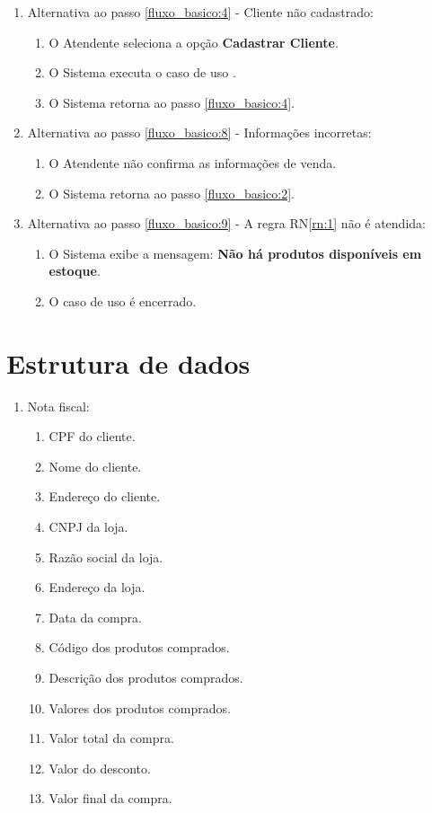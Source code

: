\begin{enumerate}
	\item Alternativa ao passo \ref{fluxo_basico:4} - Cliente não cadastrado:
	\begin{enumerate}
		\item O Atendente seleciona a opção \textbf{Cadastrar Cliente}.
		\item O Sistema executa o caso de uso .
		\item O Sistema retorna ao passo \ref{fluxo_basico:4}.
	\end{enumerate}
	\item Alternativa ao passo \ref{fluxo_basico:8} - Informações incorretas:
	\begin{enumerate}
		\item O Atendente não confirma as informações de venda.
		\item O Sistema retorna ao passo \ref{fluxo_basico:2}.
	\end{enumerate}
	\item Alternativa ao passo \ref{fluxo_basico:9} - A regra RN\ref{rn:1} não é atendida:
	\begin{enumerate}
		\item O Sistema exibe a mensagem: \textbf{Não há produtos disponíveis em estoque}.
		\item O caso de uso é encerrado.
	\end{enumerate}
\end{enumerate}

\section{Estrutura de dados}

\begin{enumerate}
	\item Nota fiscal: \label{ed:1}
	\begin{enumerate}
		\item CPF do cliente.
		\item Nome do cliente.
		\item Endereço do cliente.
		\item CNPJ da loja.
		\item Razão social da loja.
		\item Endereço da loja.
		\item Data da compra.
		\item Código dos produtos comprados.
		\item Descrição dos produtos comprados.
		\item Valores dos produtos comprados.
		\item Valor total da compra.
		\item Valor do desconto.
		\item Valor final da compra.
	\end{enumerate}
\end{enumerate}

